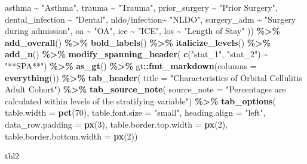 \documentclass[
]{article}
\newenvironment{Shaded}{\begin{snugshade}}{\end{snugshade}}
\newcommand{\AttributeTok}[1]{\textcolor[rgb]{0.13,0.29,0.53}{#1}}
\newcommand{\DecValTok}[1]{\textcolor[rgb]{0.00,0.00,0.81}{#1}}
\newcommand{\FunctionTok}[1]{\textcolor[rgb]{0.13,0.29,0.53}{\textbf{#1}}}
\newcommand{\NormalTok}[1]{#1}
\newcommand{\SpecialCharTok}[1]{\textcolor[rgb]{0.81,0.36,0.00}{\textbf{#1}}}
\newcommand{\StringTok}[1]{\textcolor[rgb]{0.31,0.60,0.02}{#1}}
\begin{document}
\begin{Shaded}
\begin{Highlighting}[]
\NormalTok{      asthma }\SpecialCharTok{\textasciitilde{}} \StringTok{"Asthma"}\NormalTok{,}
\NormalTok{      trauma }\SpecialCharTok{\textasciitilde{}} \StringTok{"Trauma"}\NormalTok{,}
\NormalTok{      prior\_surgery }\SpecialCharTok{\textasciitilde{}} \StringTok{"Prior Surgery"}\NormalTok{,}
\NormalTok{      dental\_infection }\SpecialCharTok{\textasciitilde{}} \StringTok{"Dental"}\NormalTok{,}
      \StringTok{\textasciigrave{}}\AttributeTok{nldo/infection}\StringTok{\textasciigrave{}}\SpecialCharTok{\textasciitilde{}} \StringTok{"NLDO"}\NormalTok{,}
\NormalTok{      surgery\_adm }\SpecialCharTok{\textasciitilde{}} \StringTok{"Surgery during admission"}\NormalTok{,}
\NormalTok{      oa }\SpecialCharTok{\textasciitilde{}} \StringTok{"OA"}\NormalTok{,}
\NormalTok{      ice }\SpecialCharTok{\textasciitilde{}} \StringTok{"ICE"}\NormalTok{,}
\NormalTok{      los }\SpecialCharTok{\textasciitilde{}} \StringTok{"Length of Stay"}
\NormalTok{      )) }\SpecialCharTok{\%\textgreater{}\%}
  \FunctionTok{add\_overall}\NormalTok{() }\SpecialCharTok{\%\textgreater{}\%} \FunctionTok{bold\_labels}\NormalTok{() }\SpecialCharTok{\%\textgreater{}\%} \FunctionTok{italicize\_levels}\NormalTok{() }\SpecialCharTok{\%\textgreater{}\%} \FunctionTok{add\_n}\NormalTok{() }\SpecialCharTok{\%\textgreater{}\%}
  \FunctionTok{modify\_spanning\_header}\NormalTok{(}
    \FunctionTok{c}\NormalTok{(}\StringTok{"stat\_1"}\NormalTok{, }\StringTok{"stat\_2"}\NormalTok{) }\SpecialCharTok{\textasciitilde{}} \StringTok{"**SPA**"}\NormalTok{) }\SpecialCharTok{\%\textgreater{}\%}
  \FunctionTok{as\_gt}\NormalTok{() }\SpecialCharTok{\%\textgreater{}\%}
\NormalTok{  gt}\SpecialCharTok{::}\FunctionTok{fmt\_markdown}\NormalTok{(}\AttributeTok{columns =} \FunctionTok{everything}\NormalTok{()) }\SpecialCharTok{\%\textgreater{}\%}
  \FunctionTok{tab\_header}\NormalTok{(}
    \AttributeTok{title =} \StringTok{"Characteristics of Orbital Cellulitis Adult Cohort"}\NormalTok{) }\SpecialCharTok{\%\textgreater{}\%} 
    \FunctionTok{tab\_source\_note}\NormalTok{(}
    \AttributeTok{source\_note =} \StringTok{"Percentages are calculated within levels of the stratifying }
\StringTok{    variable"}\NormalTok{) }\SpecialCharTok{\%\textgreater{}\%}
  \FunctionTok{tab\_options}\NormalTok{(}
    \AttributeTok{table.width =} \FunctionTok{pct}\NormalTok{(}\DecValTok{70}\NormalTok{),}
    \AttributeTok{table.font.size =} \StringTok{"small"}\NormalTok{,}
    \AttributeTok{heading.align =} \StringTok{"left"}\NormalTok{,}
    \AttributeTok{data\_row.padding =} \FunctionTok{px}\NormalTok{(}\DecValTok{3}\NormalTok{),}
    \AttributeTok{table.border.top.width =} \FunctionTok{px}\NormalTok{(}\DecValTok{2}\NormalTok{),}
    \AttributeTok{table.border.bottom.width =} \FunctionTok{px}\NormalTok{(}\DecValTok{2}\NormalTok{))}

\NormalTok{tbl2}
\end{Highlighting}
\end{Shaded}
\end{document}
